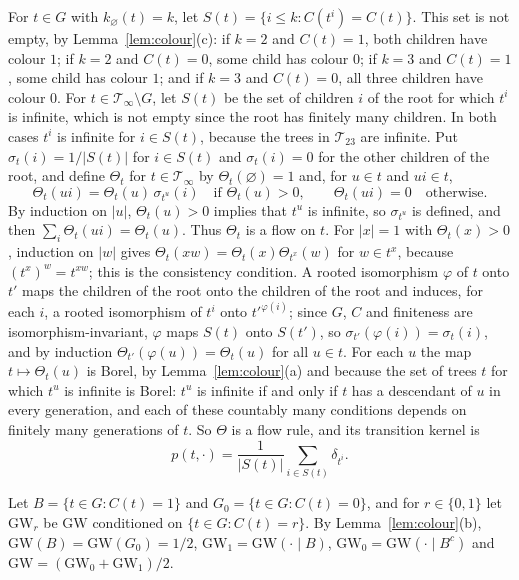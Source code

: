 \documentclass[11pt]{amsart}
\theoremstyle{remark}
\numberwithin{equation}{section}
\newcommand{\T}{\mathcal T}
\newcommand{\GW}{\mathrm{GW}}
\begin{document}
For $t\in G$ with $k_\varnothing(t)=k$, let $S(t)=\{i\le k:C(t^i)=C(t)\}$. This set is not empty, by Lemma~\ref{lem:colour}(c): if $k=2$ and $C(t)=1$, both children have colour $1$; if $k=2$ and $C(t)=0$, some child has colour $0$; if $k=3$ and $C(t)=1$, some child has colour $1$; and if $k=3$ and $C(t)=0$, all three children have colour $0$. For $t\in\T_\infty\setminus G$, let $S(t)$ be the set of children $i$ of the root for which $t^i$ is infinite, which is not empty since the root has finitely many children. In both cases $t^i$ is infinite for $i\in S(t)$, because the trees in $\T_{23}$ are infinite. Put $\sigma_t(i)=1/|S(t)|$ for $i\in S(t)$ and $\sigma_t(i)=0$ for the other children of the root, and define $\Theta_t$ for $t\in\T_\infty$ by $\Theta_t(\varnothing)=1$ and, for $u\in t$ and $ui\in t$,
\[
\Theta_t(ui)=\Theta_t(u)\,\sigma_{t^u}(i)\quad\text{if }\Theta_t(u)>0,\qquad \Theta_t(ui)=0\quad\text{otherwise}.
\]
By induction on $|u|$, $\Theta_t(u)>0$ implies that $t^u$ is infinite, so $\sigma_{t^u}$ is defined, and then $\sum_i\Theta_t(ui)=\Theta_t(u)$. Thus $\Theta_t$ is a flow on $t$. For $|x|=1$ with $\Theta_t(x)>0$, induction on $|w|$ gives $\Theta_t(xw)=\Theta_t(x)\Theta_{t^x}(w)$ for $w\in t^x$, because $(t^x)^w=t^{xw}$; this is the consistency condition. A rooted isomorphism $\varphi$ of $t$ onto $t'$ maps the children of the root onto the children of the root and induces, for each $i$, a rooted isomorphism of $t^i$ onto $t'^{\varphi(i)}$; since $G$, $C$ and finiteness are isomorphism-invariant, $\varphi$ maps $S(t)$ onto $S(t')$, so $\sigma_{t'}(\varphi(i))=\sigma_t(i)$, and by induction $\Theta_{t'}(\varphi(u))=\Theta_t(u)$ for all $u\in t$. For each $u$ the map $t\mapsto\Theta_t(u)$ is Borel, by Lemma~\ref{lem:colour}(a) and because the set of trees $t$ for which $t^u$ is infinite is Borel: $t^u$ is infinite if and only if $t$ has a descendant of $u$ in every generation, and each of these countably many conditions depends on finitely many generations of $t$. So $\Theta$ is a flow rule, and its transition kernel is
\begin{equation}\label{eq:kernel}
p(t,\cdot)=\frac1{|S(t)|}\sum_{i\in S(t)}\delta_{t^i}.
\end{equation}

Let $B=\{t\in G:C(t)=1\}$ and $G_0=\{t\in G:C(t)=0\}$, and for $r\in\{0,1\}$ let $\GW_r$ be $\GW$ conditioned on $\{t\in G:C(t)=r\}$. By Lemma~\ref{lem:colour}(b), $\GW(B)=\GW(G_0)=1/2$, $\GW_1=\GW(\cdot\mid B)$, $\GW_0=\GW(\cdot\mid B^c)$ and $\GW=(\GW_0+\GW_1)/2$.
\end{document}
